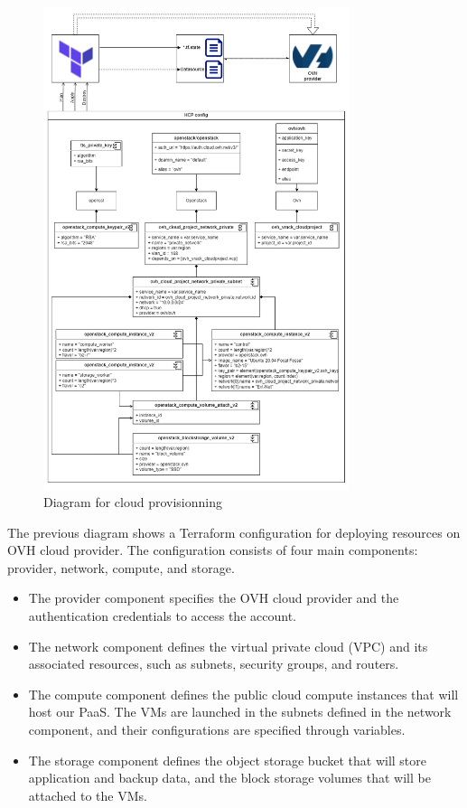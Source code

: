 \begin{figure}[H]\centering
\includegraphics[width=0.8\textwidth]{assets/f14.png}
\caption{Diagram for cloud provisionning}
\label{fig:fig14}
\end{figure}
\newpage
The previous diagram shows a Terraform configuration for deploying resources on OVH cloud provider. The configuration consists of four main components: provider, network, compute, and storage. 

\begin{itemize}[label={--}]
\item The provider component specifies the OVH cloud provider and the authentication credentials to access the account. 
\item The network component defines the virtual private cloud (VPC) and its associated resources, such as subnets, security groups, and routers. 
\item The compute component defines the public cloud compute instances that will host our PaaS. The VMs are launched in the subnets defined in the network component, and their configurations are specified through variables. 
\item The storage component defines the object storage bucket that will store application and backup data, and the block storage volumes that will be attached to the VMs. 
\end{itemize}

